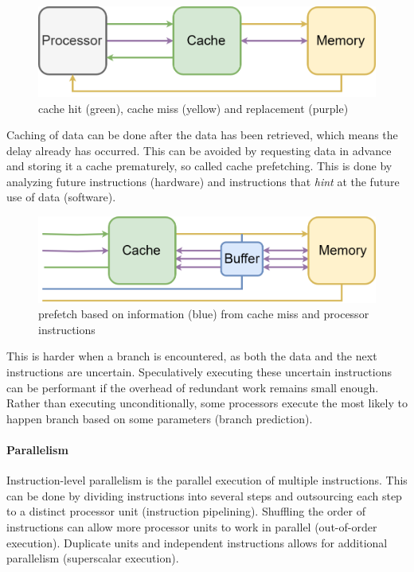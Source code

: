 \documentclass{article}
\begin{document}
\begin{figure}[ht]
    \centering
    \includegraphics[scale=0.3]{cache}
    \caption{ cache hit (green), cache miss (yellow) and replacement (purple)}
\end{figure}

Caching of data can be done after the data has been retrieved, which means the delay already has occurred.
This can be avoided by requesting data in advance and storing it a cache prematurely, so called cache prefetching.
This is done by analyzing future instructions (hardware) and instructions that {\it hint} at the future use of data (software)\cite{cache-prefetching}.

\begin{figure}[ht]
    \centering
    \includegraphics[scale=0.3]{prefetch}
    \caption{ prefetch based on information (blue) from cache miss and processor instructions }
\end{figure}

This is harder when a branch is encountered, as both the data and the next instructions are uncertain.
Speculatively executing these uncertain instructions can be performant if the overhead of redundant work remains small enough.
Rather than executing unconditionally, some processors execute the most likely to happen branch based on some parameters (branch prediction)\cite{instruction-level-parallelism}.
 
\newpage

\paragraph{Parallelism}

Instruction-level parallelism is the parallel execution of multiple instructions\cite{instruction-level-parallelism}.
This can be done by dividing instructions into several steps and outsourcing each step to a distinct processor unit (instruction pipelining).
Shuffling the order of instructions can allow more processor units to work in parallel (out-of-order execution).
Duplicate units and independent instructions allows for additional parallelism (superscalar execution).
\end{document}
